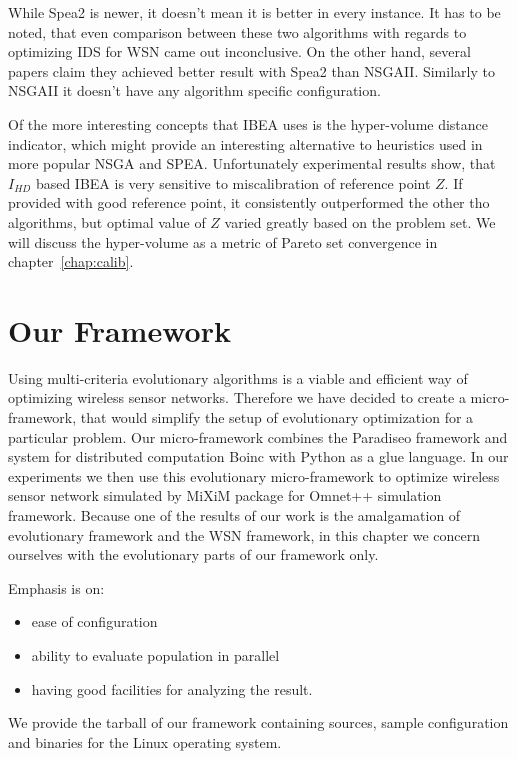 \documentclass[12pt,oneside]{fithesis2}
\begin{document}
While Spea2 is newer, it doesn't mean it is better in every instance. It has to be noted, that even comparison between these two algorithms with regards to optimizing IDS for WSN came out inconclusive.\cite{stehl2013opt} On the other hand, several papers claim they achieved better result with Spea2 than NSGAII. Similarly to NSGAII it doesn't have any algorithm specific configuration. 

Of the more interesting concepts that IBEA uses is the hyper-volume distance indicator, which might provide an interesting alternative to heuristics used in more popular NSGA and SPEA. Unfortunately experimental results show\cite{zitzler2004indicator}, that $I_{HD}$ based IBEA is very sensitive to miscalibration of reference point $Z$. If provided with good reference point, it consistently outperformed the other tho algorithms, but optimal value of $Z$ varied greatly based on the problem set. We will discuss the hyper-volume as a metric of Pareto set convergence in chapter~\ref{chap:calib}.

\chapter{Our Framework}
\label{chap:framework}
Using multi-criteria evolutionary algorithms is a viable and efficient way of optimizing wireless sensor networks\cite{stehl2013opt}. Therefore we have decided to create a micro-framework, that would simplify the setup of evolutionary optimization for a particular problem.
Our micro-framework combines the Paradiseo framework and system for distributed computation Boinc with Python as a glue language. In our experiments we then use this evolutionary micro-framework to optimize wireless sensor network simulated by MiXiM package for Omnet++ simulation framework. Because one of the results of our work is the amalgamation of evolutionary framework and the WSN framework, in this chapter we concern ourselves with the evolutionary parts of our framework only. 

Emphasis is on:
\begin{itemize}
		\item ease of configuration 
		\item ability to evaluate population in parallel 
		\item having good facilities for analyzing the result.
\end{itemize}

We provide the tarball of our framework containing sources, sample configuration and binaries for the Linux operating system\cite{tarball}.
\end{document}
